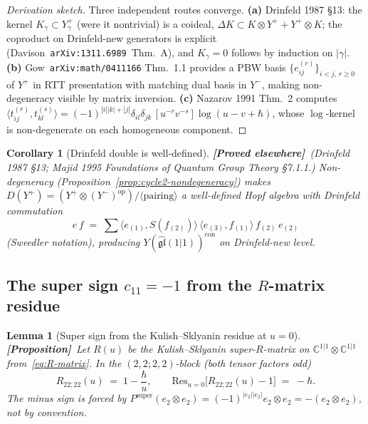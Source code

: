 \documentclass[11pt]{amsart}
\newtheorem{lemma}[theorem]{Lemma}
\newtheorem{corollary}[theorem]{Corollary}
\theoremstyle{definition}
\providecommand{\bC}{\mathbb{C}}
\providecommand{\fgl}{\mathfrak{gl}}
\providecommand{\ClaimStatusProposition}{\textbf{\textsf{[Proposition]}}}
\providecommand{\ClaimStatusProvedElsewhere}{\textbf{\textsf{[Proved elsewhere]}}}
\begin{document}
\begin{proof}[Derivation sketch]
Three independent routes converge. \textbf{(a)} Drinfeld 1987 \S13:
the kernel $K_\gamma \subset Y^+_\gamma$ (were it nontrivial) is a
coideal, $\Delta K \subset K \otimes Y^+ + Y^+ \otimes K$; the coproduct
on Drinfeld-new generators is explicit
(Davison~\texttt{arXiv:1311.6989}~Thm.~A), and $K_\gamma = 0$ follows by
induction on $|\gamma|$. \textbf{(b)} Gow~\texttt{arXiv:math/0411166}
Thm.~1.1 provides a PBW basis $\{e_{ij}^{(r)}\}_{i<j,\,r \geq 0}$ of
$Y^+$ in RTT presentation with matching dual basis in $Y^-$, making
non-degeneracy visible by matrix inversion. \textbf{(c)} Nazarov 1991
Thm.~2 computes
$\langle t_{ij}^{(r)}, t_{kl}^{(s)}\rangle = (-1)^{|i||k|+|j|}
\delta_{il}\delta_{jk}\,[u^{-r} v^{-s}]\log(u-v+\hbar)$, whose
$\log$-kernel is non-degenerate on each homogeneous component.
\end{proof}

\begin{corollary}[Drinfeld double is well-defined]
\label{cor:cycle2-drinfeld-double-welldefined}
\ClaimStatusProvedElsewhere\
\emph{(Drinfeld 1987 \S13; Majid 1995 \emph{Foundations of Quantum Group
Theory} \S7.1.1.)}
Non-degeneracy (Proposition~\ref{prop:cycle2-nondegeneracy}) makes
$D(Y^+) = (Y^+ \otimes (Y^-)^{\mathrm{op}})/\langle\text{pairing}\rangle$
a well-defined Hopf algebra with Drinfeld commutation
\[
  e\, f \;=\; \sum \bigl\langle e_{(1)}, S(f_{(2)})\bigr\rangle\,
    \bigl\langle e_{(3)}, f_{(1)}\bigr\rangle\,
    f_{(2)}\, e_{(2)}
\]
(Sweedler notation), producing $Y(\widehat{\fgl}(1|1))^{\mathrm{con}}$
on Drinfeld-new level.
\end{corollary}

\subsection{The super sign $c_{11}=-1$ from the $R$-matrix residue}
\label{subsec:cycle3-super-sign}

\begin{lemma}[Super sign from the Kulish--Sklyanin residue at $u=0$]
\label{lem:cycle3-kulish-sklyanin-residue}
\ClaimStatusProposition\
Let $R(u)$ be the Kulish--Sklyanin super-$R$-matrix on
$\bC^{1|1}\otimes\bC^{1|1}$ from~\eqref{eq:R-matrix}. In the $(2,2;2,2)$-block
(both tensor factors odd)
\[
  R_{22;22}(u) \;=\; 1 - \frac{\hbar}{u}, \qquad
  \mathrm{Res}_{u=0}\bigl[R_{22;22}(u) - 1\bigr] \;=\; -\hbar.
\]
The minus sign is forced by $P^{\mathrm{super}}(e_2 \otimes e_2) =
(-1)^{|e_2||e_2|} e_2 \otimes e_2 = -(e_2\otimes e_2)$, not by
convention.
\end{lemma}
\end{document}
